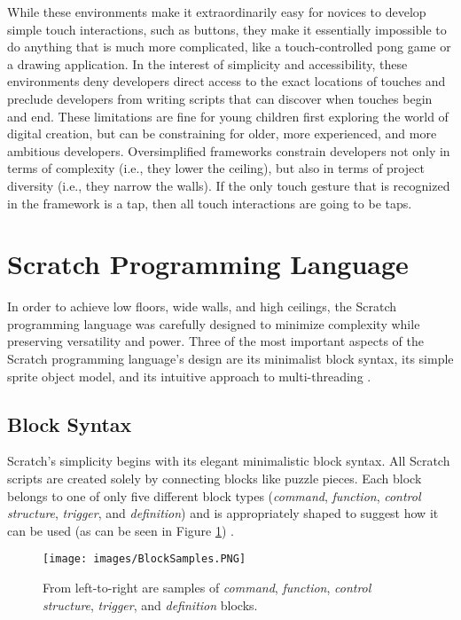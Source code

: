 While these environments make it extraordinarily easy for novices to develop simple touch interactions, such as buttons, they make it essentially impossible to do anything that is much more complicated, like a touch-controlled pong game or a drawing application. In the interest of simplicity and accessibility, these environments deny developers direct access to the exact locations of touches and preclude developers from writing scripts that can discover when touches begin and end. These limitations are fine for young children first exploring the world of digital creation, but can be constraining for older, more experienced, and more ambitious developers. Oversimplified frameworks constrain developers not only in terms of complexity (i.e., they lower the ceiling), but also in terms of project diversity (i.e., they narrow the walls). If the only touch gesture that is recognized in the framework is a tap, then all touch interactions are going to be taps.

\section{Scratch Programming Language}

In order to achieve low floors, wide walls, and high ceilings, the Scratch programming language was carefully designed to minimize complexity while preserving versatility and power. Three of the most important aspects of the Scratch programming language's design are its minimalist block syntax, its simple sprite object model, and its intuitive approach to multi-threading \cite{Maloney}.


\subsection{Block Syntax}

Scratch's simplicity begins with its elegant minimalistic block syntax. All Scratch scripts are created solely by connecting blocks like puzzle pieces. Each block belongs to one of only five different block types (\emph{command}, \emph{function}, \emph{control structure}, \emph{trigger}, and \emph{definition}) and is appropriately shaped to suggest how it can be used (as can be seen in Figure \ref{BlockSamples}) \cite{Maloney}.

\begin{figure}
\centering
\texttt{[image: images/BlockSamples.PNG]}
\caption[Samples of Scratch's Five Block Types]
{From left-to-right are samples of \emph{command}, \emph{function}, \emph{control structure}, \emph{trigger}, and \emph{definition} blocks. }
\label{BlockSamples}
\end{figure}

